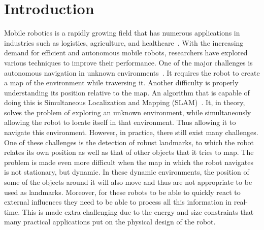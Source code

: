 \chapter{Introduction}\label{chapter:introduction}

Mobile robotics is a rapidly growing field that has numerous applications in industries such as logistics, agriculture, and healthcare~\cite{cognominal2021evolving,kebede2024review,clark2023amazon}. With the increasing demand for efficient and autonomous mobile robots, researchers have explored various techniques to improve their performance. One of the major challenges is autonomous navigation in unknown environments~\cite{alatise2020review}. It requires the robot to create a map of the environment while traversing it. Another difficulty is properly understanding its position relative to the map. An algorithm that is capable of doing this is Simultaneous Localization and Mapping (SLAM)~\cite{whyte1996slam,whyte2006slam}. It, in theory, solves the problem of exploring an unknown environment, while simultaneously allowing the robot to locate itself in that environment. Thus allowing it to navigate this environment. However, in practice, there still exist many challenges. One of these challenges is the detection of robust landmarks, to which the robot relates its own position as well as that of other objects that it tries to map. The problem is made even more difficult when the map in which the robot navigates is not stationary, but dynamic. In these dynamic environments, the position of some of the objects around it will also move and thus are not appropriate to be used as landmarks. Moreover, for these robots to be able to quickly react to external influences they need to be able to process all this information in real-time. This is made extra challenging due to the energy and size constraints that many practical applications put on the physical design of the robot.

